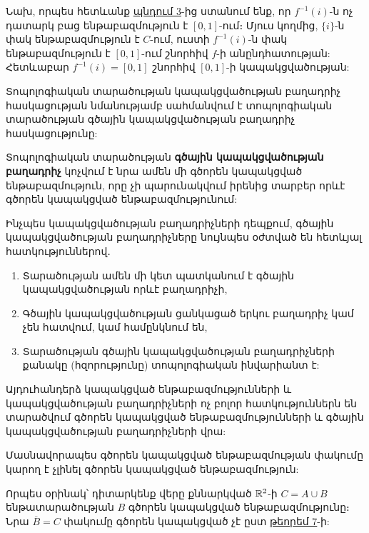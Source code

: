 \documentclass[./main.tex]{subfiles}
\begin{document}
\begin{varproof}
Նախ, որպես հետևանք \hyperref[պնդում:3]{պնդում 3}-ից ստանում ենք, որ $f^{-1}(i)$-ն ոչ դատարկ բաց ենթաբազմություն է $[0,1]$-ում։ Մյուս կողմից, $\{i\}$-ն փակ ենթաբազմություն է $C$-ում, ուստի $f^{-1}(i)$-ն փակ ենթաբազմություն է $[0,1]$-ում շնորհիվ $f$-ի անընդհատության: Հետևաբար $f^{-1}(i)=[0,1]$ շնորհիվ $[0,1]$-ի կապակցվածության:
\end{varproof}

\par Տոպոլոգիական տարածության կապակցվածության բաղադրիչ հասկացության նմանությամբ սահմանվում է տոպոլոգիական տարածության գծային կապակցվա\-ծության բաղադրիչ հասկացությունը:

\begin{definition}
Տոպոլոգիական տարածության \textbf{գծային կապակցվածության բա\-ղա\-դրիչ} կոչվում է նրա ամեն մի գծորեն կապակցված ենթաբազմություն, որը չի պա\-րու\-նակ\-վում իրենից տարբեր որևէ գծորեն կապակցված ենթաբազմությունում:
\end{definition}

\par Ինչպես կապակցվածության բաղադրիչների դեպքում, գծային կապակցվա\-ծու\-թյան բաղադրիչները նույնպես օժտված են հետևյալ հատկություններով․

\begin{enumerate}
    \item[Հ1․] \label{Հ1 հատկություն} 
Տարածության ամեն մի կետ պատկանում է գծային կապակցվածության որևէ բաղադրիչի,


\item[Հ2․]\label{Հ2 հատկություն}
Գծային կապակցվածության ցանկացած երկու բաղադրիչ կամ չեն հատվում, կամ համընկնում են,

\item[Հ3․]\label{Հ3 հատկություն}
Տարածության գծային կապակցվածության բաղադրիչների քանակը (հզո\-րու\-թյու\-նը) տոպոլոգիական ինվարիանտ է:
\end{enumerate}

\par Այդուհանդերձ կապակցված ենթաբազմությունների և կապակցվածության բա\-ղա\-դրիչ\-նե\-րի ոչ բոլոր հատկություններն են տարածվում գծորեն կապակցված են\-թա\-բազ\-մու\-թյուն\-նե\-րի և գծային կապակցվածության բաղադրիչների վրա:

\par Մասնավորապես գծորեն կապակցված ենթաբազմության փակումը կարող է չլի\-նել գծորեն կապակցված ենթաբազմություն:

\par Որպես օրինակ՝ դիտարկենք վերը քննարկված $\mathbb{R}^2$-ի $C=A\cup B$ ենթա\-տա\-րա\-ծու\-թյան $B$ գծորեն կա\-պակ\-ցված ենթաբազմությունը։ Նրա $\overline{B}=C$ փակումը գծորեն կա\-պա\-կցված չէ ըստ \hyperref[ch15thm7]{թեորեմ 7}-ի:
\end{document}
